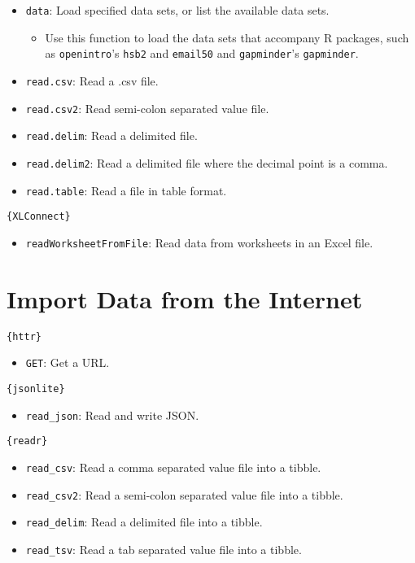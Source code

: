 \documentclass[]{book}
\providecommand{\tightlist}{%
  \setlength{\itemsep}{0pt}\setlength{\parskip}{0pt}}
\begin{document}
\begin{itemize}
\tightlist
\item
  \texttt{data}: Load specified data sets, or list the available data sets.

  \begin{itemize}
  \tightlist
  \item
    Use this function to load the data sets that accompany R packages, such as \texttt{openintro}'s \texttt{hsb2} and \texttt{email50} and \texttt{gapminder}'s \texttt{gapminder}.
  \end{itemize}
\item
  \texttt{read.csv}: Read a .csv file.
\item
  \texttt{read.csv2}: Read semi-colon separated value file.
\item
  \texttt{read.delim}: Read a delimited file.
\item
  \texttt{read.delim2}: Read a delimited file where the decimal point is a comma.
\item
  \texttt{read.table}: Read a file in table format.
\end{itemize}

\texttt{\{XLConnect\}}

\begin{itemize}
\tightlist
\item
  \texttt{readWorksheetFromFile}: Read data from worksheets in an Excel file.
\end{itemize}

\hypertarget{import-data-from-the-internet}{%
\section{Import Data from the Internet}\label{import-data-from-the-internet}}

\texttt{\{httr\}}

\begin{itemize}
\tightlist
\item
  \texttt{GET}: Get a URL.
\end{itemize}

\texttt{\{jsonlite\}}

\begin{itemize}
\tightlist
\item
  \texttt{read\_json}: Read and write JSON.
\end{itemize}

\texttt{\{readr\}}

\begin{itemize}
\tightlist
\item
  \texttt{read\_csv}: Read a comma separated value file into a tibble.
\item
  \texttt{read\_csv2}: Read a semi-colon separated value file into a tibble.
\item
  \texttt{read\_delim}: Read a delimited file into a tibble.
\item
  \texttt{read\_tsv}: Read a tab separated value file into a tibble.
\end{itemize}
\end{document}
